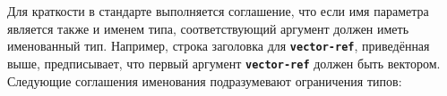 Для краткости в стандарте выполняется соглашение, что если имя параметра является также и
именем типа, соответствующий аргумент должен иметь именованный тип. Например, строка
заголовка для {\bfseries\tt vector-ref}, приведённая выше, предписывает, что первый аргумент
{\bfseries\tt vector-ref} должен быть вектором. Следующие соглашения именования
подразумевают ограничения типов:\vspace{1mm}

